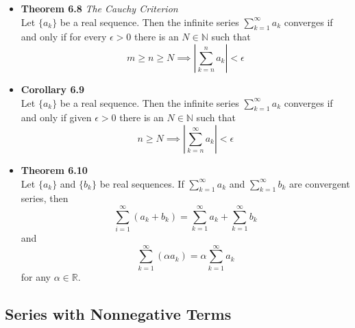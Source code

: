 \documentclass[11pt,a4paper]{article}
\begin{document}
\begin{itemize}
    \item \textbf{Theorem 6.8} \emph{The Cauchy Criterion} \\
        Let $\{a_k\}$ be a real sequence.
        Then the infinite series $\sum_{k=1}^\infty a_k$ converges if and only if for every
        $\epsilon > 0$ there is an $N \in \mathbb{N}$ such that
        \[
            m \geq n \geq N \implies \left| \sum_{k=n}^n a_k \right| < \epsilon
        \]

    \item \textbf{Corollary 6.9} \\
        Let $\{a_k\}$ be a real sequence.
        Then the infinite series $\sum_{k=1}^\infty a_k$ converges if and only if given
        $\epsilon > 0$ there is an $N \in \mathbb{N}$ such that
        \[
            n \geq N \implies \left| \sum_{k=n}^\infty a_k \right| < \epsilon
        \]

    \item \textbf{Theorem 6.10} \\
        Let $\{a_k\}$ and $\{b_k\}$ be real sequences.
        If $\sum_{k=1}^\infty a_k$ and $\sum_{k=1}^\infty b_k$ are convergent series, then
        \[
            \sum_{i=1}^\infty (a_k + b_k) = \sum_{k=1}^\infty a_k + \sum_{k=1}^\infty b_k
        \]
        and
        \[
            \sum_{k=1}^\infty (\alpha a_k) = \alpha \sum_{k=1}^\infty a_k
        \]
        for any $\alpha \in \mathbb{R}$.
\end{itemize}

\subsection{Series with Nonnegative Terms}
\end{document}

